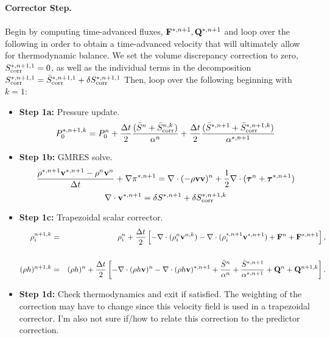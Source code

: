 \documentclass[final]{siamltex}
\def\Fb {{\bf F}}
\def\Qb {{\bf Q}}
\def\vb {{\bf v}}
\def\taub   {\boldsymbol{\tau}}
\begin{document}
{\bf Corrector Step.}\\ \\
Begin by computing time-advanced fluxes, $\Fb^{*,n+1}, \Qb^{*,n+1}$ and loop over
the following in order to obtain a time-advanced velocity that will ultimately
allow for thermodynamic balance.  We set the volume discrepancy correction to zero,
$S_{\rm corr}^{*,n+1,1} = 0$, as well as the individual terms in the decomposition
$S_{\rm corr}^{*,n+1,1} = \bar{S}_{\rm corr}^{*,n+1,1} + \delta S_{\rm corr}^{*,n+1,1}$
Then, loop over the following beginning with $k=1$:\\
\begin{itemize}
\item {\bf Step 1a:} Pressure update.
\begin{equation}
P_0^{*,n+1,k} = P_0^n + \frac{\Delta t}{2}\frac{(\bar{S}^n + \bar{S}_{\rm corr}^{n,k})}{\alpha^n} + \frac{\Delta t}{2}\frac{(\bar{S}^{*,n+1} + \bar{S}_{\rm corr}^{*,n+1,k})}{\alpha^{*,n+1}}
\end{equation}
\item {\bf Step 1b:} GMRES solve.
\begin{equation}
\frac{\rho^{*,n+1}\vb^{*,n+1} - \rho^n\vb^n}{\Delta t} + \nabla\pi^{*,n+1} = \nabla\cdot(-\rho\vb\vb)^n + \frac{1}{2}\nabla\cdot(\taub^n + \taub^{*,n+1})
\end{equation}
\begin{equation}
\nabla\cdot\vb^{*,n+1} = \delta S^{*,n+1} + \delta S_{\rm corr}^{*,n+1,k}
\end{equation}
\item {\bf Step 1c:} Trapezoidal scalar corrector.
\begin{eqnarray}
\rho_i^{n+1,k} &=& \rho_i^n + \frac{\Delta t}{2}\left[-\nabla\cdot(\rho_i^n\vb^{n,k}) -\nabla\cdot(\rho_i^{*,n+1}\vb^{*,n+1}) + \Fb^n + \Fb^{*,n+1}\right],\nonumber \\
\\
(\rho h)^{n+1,k} &=& (\rho h)^n + \frac{\Delta t}{2}\left[-\nabla\cdot(\rho h\vb)^n -\nabla\cdot(\rho h\vb)^{*,n+1} + \frac{\bar{S}^n}{\alpha^n} + \frac{\bar{S}^{*,n+1}}{\alpha^{*,n+1}} + \Qb^n + \Qb^{n+1,k}\right].\nonumber\\
\end{eqnarray}
\item {\bf Step 1d:} Check thermodynamics and exit if satisfied.  The weighting of the
correction may have to change since this velocity field is used in a trapezoidal corrector.
I'm also not sure if/how to relate this correction to the predictor correction.
\end{itemize}
\end{document}

